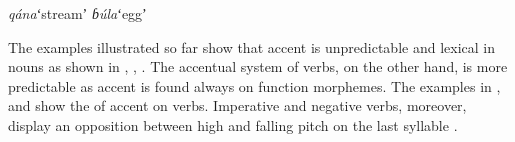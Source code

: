 \documentclass[output=paper]{LSP/langsci}
\begin{document}
\begin{exe}
\ex \label{ex:Petrollino:qánabúla} \begin{xlist}
\ex \textit{qána}\hspace{15mm}ʻstreamʼ
\ex \textit{ɓúla}\hspace{16mm}ʻeggʼ
\end{xlist}
\end{exe}
The examples illustrated so far show that accent is unpredictable and lexical in nouns as shown in , , . The accentual system of  verbs, on the other hand, is more predictable as accent is found always on function morphemes. The examples in ,  and  show the  of accent on verbs. Imperative and negative verbs, moreover, display an opposition between high and falling pitch on the last syllable .  
\end{document}
